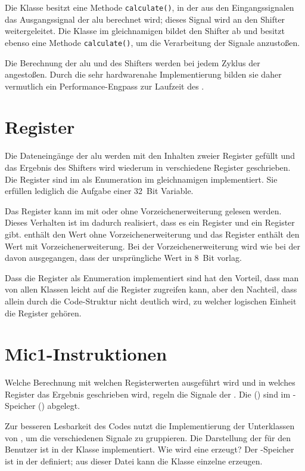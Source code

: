 Die Klasse besitzt eine Methode \texttt{calculate()}, in der aus den Eingangssignalen das Ausgangssignal der \gls{alu} berechnet wird; dieses Signal wird an den Shifter weitergeleitet. Die Klasse  im gleichnamigen \package bildet den Shifter ab und besitzt ebenso eine Methode \texttt{calculate()}, um die Verarbeitung der Signale anzustoßen.

Die Berechnung der \gls{alu} und des Shifters werden bei jedem Zyklus der \mic angestoßen. Durch die sehr hardwarenahe Implementierung bilden sie daher vermutlich ein Performance-Engpass zur Laufzeit des \md.

\section{Register}
Die Dateneingänge der \gls{alu} werden mit den Inhalten zweier Register gefüllt und das Ergebnis des Shifters wird wiederum in verschiedene Register geschrieben. Die Register sind im \md als Enumeration  im gleichnamigen \package implementiert. Sie erfüllen lediglich die Aufgabe einer 32~Bit Variable.

Das Register  kann im \mic mit oder ohne Vorzeichenerweiterung gelesen werden. Dieses Verhalten ist im \md dadurch realisiert, dass es ein Register  und ein Register  gibt.  enthält den Wert ohne Vorzeichenerweiterung und das Register  enthält den Wert mit Vorzeichenerweiterung. Bei der Vorzeichenerweiterung wird wie bei der \mic davon ausgegangen, dass der ursprüngliche Wert in 8~Bit vorlag.

Dass die Register als Enumeration implementiert sind hat den Vorteil, dass man von allen Klassen leicht auf die Register zugreifen kann, aber den Nachteil, dass allein durch die Code-Struktur nicht deutlich wird, zu welcher logischen Einheit die Register gehören.

\section{Mic1-Instruktionen}
Welche Berechnung mit welchen Registerwerten ausgeführt wird und in welches Register das Ergebnis geschrieben wird, regeln die Signale der \mais. Die \mais () sind im \mac-Speicher () abgelegt.

Zur besseren Lesbarkeit des Codes nutzt die Implementierung der \mai Unterklassen von , um die verschiedenen Signale zu gruppieren. Die Darstellung der \mai für den Benutzer ist in der Klasse  implementiert. Wie wird eine \mai erzeugt? Der \mac-Speicher ist in der  definiert; aus dieser Datei kann die Klasse  einzelne \mais erzeugen.

